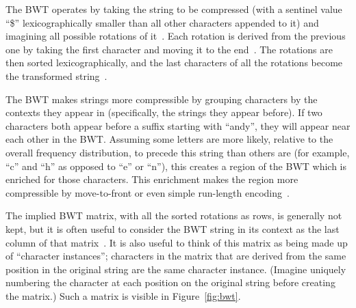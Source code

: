 The BWT operates by taking the string to be compressed (with a sentinel value ``\$'' lexicographically smaller than all other characters appended to it) and imagining all possible rotations of it~\cite{burrows1994block, ferragina2000opportunistic}. Each rotation is derived from the previous one by taking the first character and moving it to the end~\cite{burrows1994block}. The rotations are then sorted lexicographically, and the last characters of all the rotations become the transformed string~\cite{burrows1994block}.

The BWT makes strings more compressible by grouping characters by the contexts they appear in (specifically, the strings they appear before). If two characters both appear before a suffix starting with ``andy'', they will appear near each other in the BWT. Assuming some letters are more likely, relative to the overall frequency distribution, to precede this string than others are (for example, ``c'' and ``h'' as opposed to ``e'' or ``n''), this creates a region of the BWT which is enriched for those characters. This enrichment makes the region more compressible by move-to-front or even simple run-length encoding~\cite{burrows1994block}.

The implied BWT matrix, with all the sorted rotations as rows, is generally not kept, but it is often useful to consider the BWT string in its context as the last column of that matrix~\cite{burrows1994block, ferragina2000opportunistic}. It is also useful to think of this matrix as being made up of ``character instances''; characters in the matrix that are derived from the same position in the original string are the same character instance. (Imagine uniquely numbering the character at each position on the original string before creating the matrix.) Such a matrix is visible in Figure~\ref{fig:bwt}.

